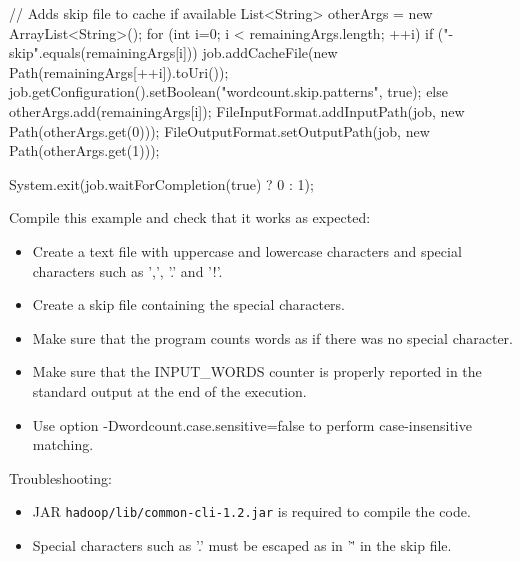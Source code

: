 \documentclass[11pt]{article}
\begin{document}
\begin{java}
{{    // Adds skip file to cache if available
    List<String> otherArgs = new ArrayList<String>();
    for (int i=0; i < remainingArgs.length; ++i) {
      if ("-skip".equals(remainingArgs[i])) {
        job.addCacheFile(new Path(remainingArgs[++i]).toUri());
        job.getConfiguration().setBoolean("wordcount.skip.patterns", true);
      } else {
        otherArgs.add(remainingArgs[i]);
      }
    }
    FileInputFormat.addInputPath(job, new Path(otherArgs.get(0)));
    FileOutputFormat.setOutputPath(job, new Path(otherArgs.get(1)));

    System.exit(job.waitForCompletion(true) ? 0 : 1);
  }
}  
\end{java}
Compile this example and check that it works as expected:
\begin{itemize}
\item Create a
  text file with uppercase and lowercase characters and special
  characters such as ',', '.' and '!'.
\item Create a skip file containing the
  special characters.
\item Make sure that the program counts words as if there was no
  special character.
\item Make sure that the INPUT\_WORDS counter is properly
  reported in the standard output at the end of the execution.
\item Use option -Dwordcount.case.sensitive=false to perform case-insensitive matching.
\end{itemize}

Troubleshooting:
\begin{itemize}
\item JAR
\texttt{hadoop/lib/common-cli-1.2.jar} is required to compile the
code.
\item Special characters such as '.' must be
  escaped as in '\.' in the skip file.
  \end{itemize}

 
\end{document}
